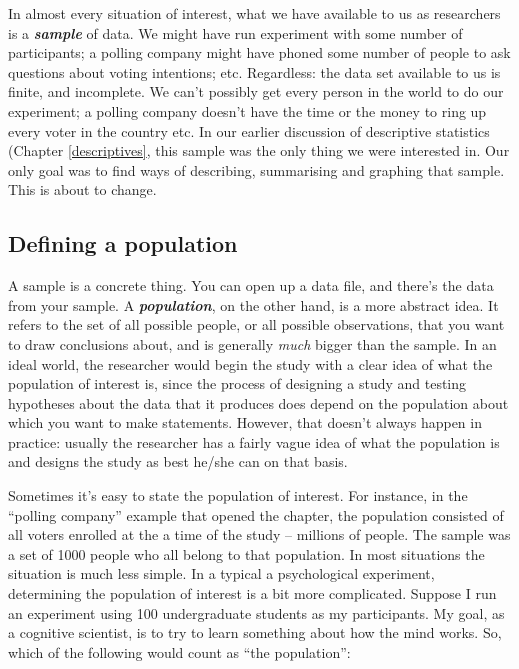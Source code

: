 \documentclass[
]{book}
\begin{document}
In almost every situation of interest, what we have available to us as researchers is a \textbf{\emph{sample}} of data. We might have run experiment with some number of participants; a polling company might have phoned some number of people to ask questions about voting intentions; etc. Regardless: the data set available to us is finite, and incomplete. We can't possibly get every person in the world to do our experiment; a polling company doesn't have the time or the money to ring up every voter in the country etc. In our earlier discussion of descriptive statistics (Chapter \ref{descriptives}, this sample was the only thing we were interested in. Our only goal was to find ways of describing, summarising and graphing that sample. This is about to change.

\hypertarget{pop}{%
\subsection{Defining a population}\label{pop}}

A sample is a concrete thing. You can open up a data file, and there's the data from your sample. A \textbf{\emph{population}}, on the other hand, is a more abstract idea. It refers to the set of all possible people, or all possible observations, that you want to draw conclusions about, and is generally \emph{much} bigger than the sample. In an ideal world, the researcher would begin the study with a clear idea of what the population of interest is, since the process of designing a study and testing hypotheses about the data that it produces does depend on the population about which you want to make statements. However, that doesn't always happen in practice: usually the researcher has a fairly vague idea of what the population is and designs the study as best he/she can on that basis.

Sometimes it's easy to state the population of interest. For instance, in the ``polling company'' example that opened the chapter, the population consisted of all voters enrolled at the a time of the study -- millions of people. The sample was a set of 1000 people who all belong to that population. In most situations the situation is much less simple. In a typical a psychological experiment, determining the population of interest is a bit more complicated. Suppose I run an experiment using 100 undergraduate students as my participants. My goal, as a cognitive scientist, is to try to learn something about how the mind works. So, which of the following would count as ``the population'':
\end{document}
